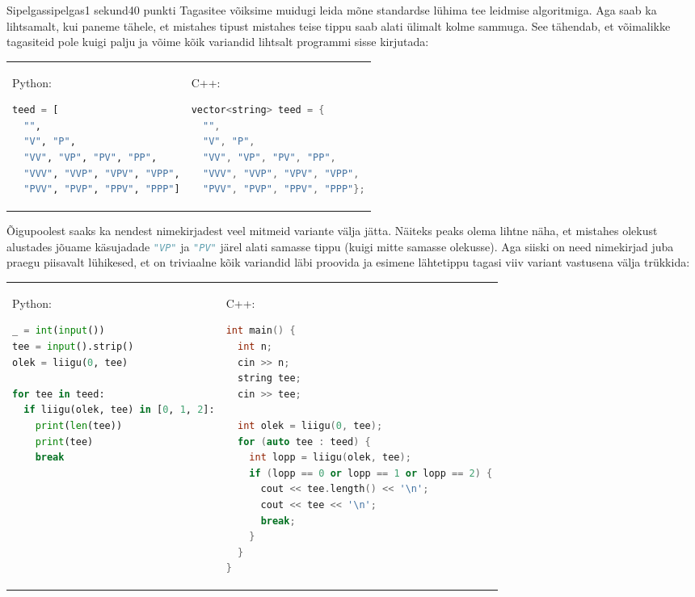 \begin{yl}{4}{Sipelgas}{sipelgas}{1 sekund}{40 punkti}
Tagasitee võiksime muidugi leida mõne standardse lühima tee leidmise algoritmiga. Aga saab ka lihtsamalt, kui paneme tähele, et mistahes tipust mistahes teise tippu saab alati ülimalt kolme sammuga. See tähendab, et võimalikke tagasiteid pole kuigi palju ja võime kõik variandid lihtsalt programmi sisse kirjutada:

\begin{tabular}{p{\colwidth} p{\colwidth}}
Python:
\begin{lstlisting}[language=Python]
teed = [
  "",
  "V", "P",
  "VV", "VP", "PV", "PP",
  "VVV", "VVP", "VPV", "VPP",
  "PVV", "PVP", "PPV", "PPP"]
\end{lstlisting}
&
C++:
\begin{lstlisting}[language=C++]
vector<string> teed = {
  "",
  "V", "P",
  "VV", "VP", "PV", "PP",
  "VVV", "VVP", "VPV", "VPP",
  "PVV", "PVP", "PPV", "PPP"};
\end{lstlisting}
\end{tabular}

Õigupoolest saaks ka nendest nimekirjadest veel mitmeid variante välja jätta. Näiteks peaks olema lihtne näha, et mistahes olekust alustades jõuame käsujadade \lstinline[language=Python]|"VP"| ja \lstinline[language=Python]|"PV"| järel alati samasse tippu (kuigi mitte samasse olekusse). Aga siiski on need nimekirjad juba praegu piisavalt lühikesed, et on triviaalne kõik variandid läbi proovida ja esimene lähtetippu tagasi viiv variant vastusena välja trükkida:

\begin{tabular}{p{\colwidth} p{\colwidth}}
Python:
\begin{lstlisting}[language=Python]
_ = int(input())
tee = input().strip()
olek = liigu(0, tee)

for tee in teed:
  if liigu(olek, tee) in [0, 1, 2]:
    print(len(tee))
    print(tee)
    break
\end{lstlisting}
&
C++:
\begin{lstlisting}[language=C++]
int main() {
  int n;
  cin >> n;
  string tee;
  cin >> tee;

  int olek = liigu(0, tee);
  for (auto tee : teed) {
    int lopp = liigu(olek, tee);
    if (lopp == 0 or lopp == 1 or lopp == 2) {
      cout << tee.length() << '\n';
      cout << tee << '\n';
      break;
    }
  }
}
\end{lstlisting}
\end{tabular}


\end{yl}
